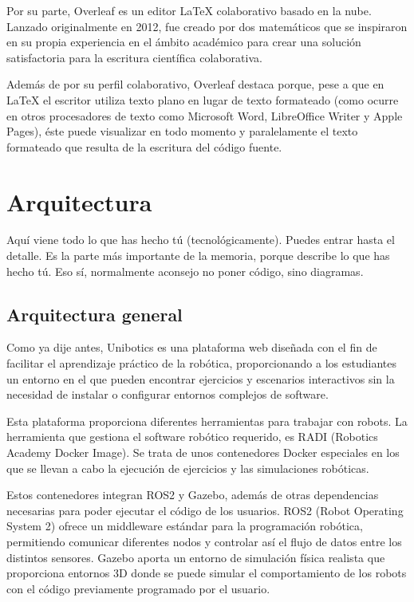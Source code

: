 \documentclass[a4paper, 12pt]{book}
\begin{document}
Por su parte, Overleaf es un editor LaTeX colaborativo basado en la nube. Lanzado originalmente en 2012, fue creado por dos matemáticos que se inspiraron en su propia experiencia en el ámbito académico para crear una solución satisfactoria para la escritura científica colaborativa.

Además de por su perfil colaborativo, Overleaf destaca porque, pese a que en LaTeX el escritor utiliza texto plano en lugar de texto formateado (como ocurre en otros procesadores de texto como Microsoft Word, LibreOffice Writer y Apple Pages), éste puede visualizar en todo momento y paralelamente el texto formateado que resulta de la escritura del código fuente.

\cleardoublepage


\chapter{Arquitectura}
\label{chap:diseño}


Aquí viene todo lo que has hecho tú (tecnológicamente). 
Puedes entrar hasta el detalle. 
Es la parte más importante de la memoria, porque describe lo que has hecho tú.
Eso sí, normalmente aconsejo no poner código, sino diagramas.

\section{Arquitectura general} 
\label{sec:arquitectura}

Como ya dije antes, Unibotics es una plataforma web diseñada con el fin de facilitar el aprendizaje práctico de la robótica, proporcionando a los estudiantes un entorno en el que pueden encontrar ejercicios y escenarios interactivos sin la necesidad de instalar o configurar entornos complejos de software. 

Esta plataforma proporciona diferentes herramientas para trabajar con robots. La herramienta que gestiona el software robótico requerido, es RADI (Robotics Academy Docker Image). Se trata de unos contenedores Docker especiales en los que se llevan a cabo la ejecución de ejercicios y las simulaciones robóticas.
 
Estos contenedores integran ROS2 y Gazebo, además de otras dependencias necesarias para poder ejecutar el código de los usuarios. 
ROS2 (Robot Operating System 2) ofrece un middleware estándar para la programación robótica, permitiendo comunicar diferentes nodos y controlar así el flujo de datos entre los distintos sensores. 
Gazebo aporta un entorno de simulación física realista que proporciona entornos 3D donde se puede simular el comportamiento de los robots con el código previamente programado por el usuario.
 
\end{document}
